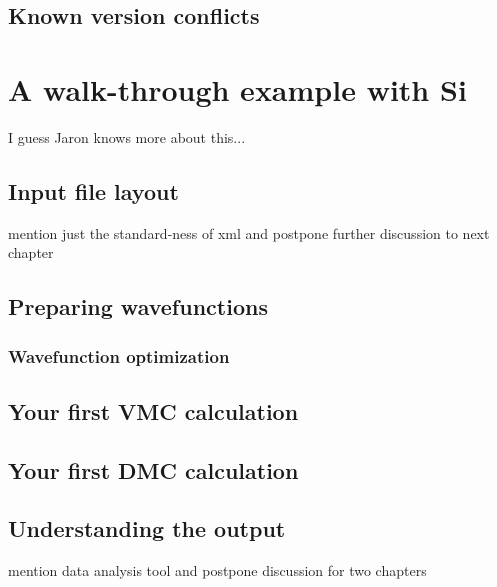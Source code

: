 \subsection{Known version conflicts}
\section{A walk-through example with Si}
I guess Jaron knows more about this...
\subsection{Input file layout}
mention just the standard-ness of xml and postpone further discussion to next chapter
\subsection{Preparing wavefunctions}
\subsubsection{Wavefunction optimization}
\subsection{Your first VMC calculation}
\subsection{Your first DMC calculation}
\subsection{Understanding the output}
mention data analysis tool and postpone discussion for two chapters
